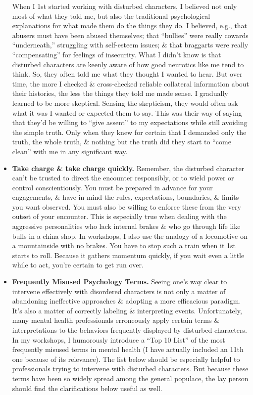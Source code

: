 \documentclass{article}
\numberwithin{equation}{section}
\begin{document}
\begin{itemize}
	When I 1st started working with disturbed characters, I believed not only most of what they told me, but also the traditional psychological explanations for what made them do the things they do. I believed, e.g., that abusers must have been abused themselves; that ``bullies'' were really cowards ``underneath,'' struggling with self-esteem issues; \& that braggarts were really ``compensating'' for feelings of insecurity. What I didn't know is that disturbed characters are keenly aware of how good neurotics like me tend to think. So, they often told me what they thought I wanted to hear. But over time, the more I checked \& cross-checked reliable collateral information about their histories, the less the things they told me made sense. I gradually learned to be more skeptical. Sensing the skepticism, they would often ask what it was I wanted or expected them to say. This was their way of saying that they'd be willing to ``give assent'' to my expectations while still avoiding the simple truth. Only when they knew for certain that I demanded only the truth, the whole truth, \& nothing but the truth did they start to ``come clean'' with me in any significant way.
	\item \textbf{Take charge \& take charge quickly.} Remember, the disturbed character can't be trusted to direct the encounter responsibly, or to wield power or control conscientiously. You must be prepared in advance for your engagements, \& have in mind the rules, expectations, boundaries, \& limits you want observed. You must also be willing to enforce these from the very outset of your encounter. This is especially true when dealing with the aggressive personalities who lack internal brakes \& who go through life like bulls in a china shop. In workshops, I also use the analogy of a locomotive on a mountainside with no brakes. You have to stop such a train when it 1st starts to roll. Because it gathers momentum quickly, if you wait even a little while to act, you're certain to get run over.
	\item \textbf{Frequently Misused Psychology Terms.} Seeing one's way clear to intervene effectively with disordered characters is not only a matter of abandoning ineffective approaches \& adopting a more efficacious paradigm. It's also a matter of correctly labeling \& interpreting events. Unfortunately, many mental health professionals erroneously apply certain terms \& interpretations to the behaviors frequently displayed by disturbed characters. In my workshops, I humorously introduce a ``Top 10 List'' of the most frequently misused terms in mental health (I have actually included an 11th one because of its relevance). The list below should be especially helpful to professionals trying to intervene with disturbed characters. But because these terms have been so widely spread among the general populace, the lay person should find the clarifications below useful as well.

\end{itemize}
\end{document}
